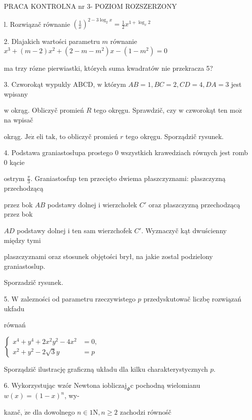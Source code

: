 \documentclass[a4paper,12pt]{article}
\begin{document}
PRACA KONTROLNA nr 3- POZIOM ROZSZERZONY

l. Rozwiązač równanie $(\displaystyle \frac{1}{x})^{2-3\log_{2}x}=\frac{1}{2}x^{1+\log_{x}2}$

2. Dlajakich wartości parametru $m$ równanie $x^{3}+(m-2)x^{2}+(2-m-m^{2})x-(1-m^{2})=0$

ma trzy rózne pierwiastki, których suma kwadratów nie przekracza 5?

3. Czworokąt wypukly ABCD, $\mathrm{w}$ którym $AB=1, BC=2, CD=4, DA=3$ jest wpisany

$\mathrm{w}$ okrąg. Obliczyč promień $R$ tego okręgu. Sprawdzič, czy $\mathrm{w}$ czworokąt ten $\mathrm{m}\mathrm{o}\dot{\mathrm{z}}$ na wpisač

okrąg. $\mathrm{J}\mathrm{e}\dot{\mathrm{z}}$ eli $\mathrm{t}\mathrm{a}\mathrm{k}$, to obliczyč promień $r$ tego okręgu. Sporządzič rysunek.

4. Podstawa graniastosłupa prostego $0$ wszystkich krawedziach równych jest romb $0$ kącie

ostrym $\displaystyle \frac{\pi}{3}$. Graniastosfup ten przecięto dwiema płaszczyznami: plaszczyzną przechodzącą

przez bok $AB$ podstawy dolnej $\mathrm{i}$ wierzchołek $C'$ oraz płaszczyzną przechodzącą przez bok

$AD$ podstawy dolnej $\mathrm{i}$ ten sam wierzchofek $C'$. Wyznaczyč kąt dwuścienny między tymi

plaszczyznami oraz stosunek objętości brył, na jakie zostal podzielony graniastoslup.

Sporzadzič rysunek.

5. $\mathrm{W}$ zalezności od parametru rzeczywistego $p$ przedyskutowač liczbę rozwiązań ukfadu

równań

$\left\{\begin{array}{ll}
x^{4}+y^{4}+2x^{2}y^{2}-4x^{2} & =0,\\
x^{2}+y^{2}-2\sqrt{3}y & =p
\end{array}\right.$

Sporządzič ilustrację graficzną układu dla kilku charakterystycznych $p.$

6. Wykorzystując wzór Newtona $\mathrm{i}\mathrm{o}\mathrm{b}\mathrm{l}\mathrm{i}\mathrm{c}\mathrm{z}\mathrm{a}\mathrm{j}_{\Phi}\mathrm{c}$ pochodną wielomianu $w(x)=(1-x)^{n}$, wy-

kazač, $\dot{\mathrm{z}}\mathrm{e}$ dla dowolnego $n\in 1\mathrm{N}, n\geq 2$ zachodzi równośč
\end{document}
